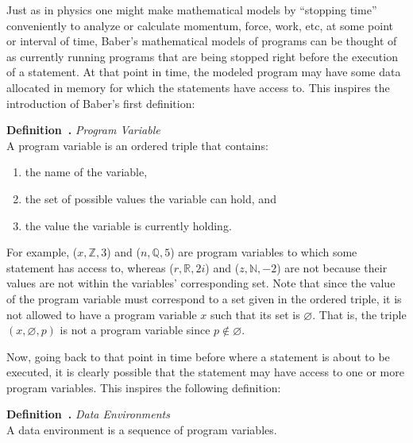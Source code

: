 \documentclass[11pt]{article}
\newcounter{definition}
\newenvironment{definition}[1][]{\stepcounter{definition}\par\medskip\noindent
\textbf{Definition~\thesection.\thedefinition #1} \rmfamily}{}
\newcounter{example}
\begin{document}
Just as in physics one might make mathematical models by ``stopping time'' conveniently to analyze or calculate momentum, force, work, etc, at some point or interval of time, Baber's mathematical models of programs can be thought of as currently running programs that are being stopped right before the execution of a statement. At that point in time, the modeled program may have some data allocated in memory for which the statements have access to. This inspires the introduction of Baber's first definition:

\begin{definition} \emph{Program Variable} \\
A program variable is an ordered triple that contains:
\begin{enumerate}[noitemsep]
\item the name of the variable,
\item the set of possible values the variable can hold, and
\item the value the variable is currently holding.
\end{enumerate}
\end{definition}

For example, ($x,\mathbb{Z},3$) and ($n,\mathbb{Q},5$) are program variables to which some statement has access to, whereas ($r,\mathbb{R},2i$) and ($z,\mathbb{N},-2$) are not because their values are not within the variables' corresponding set. Note that since the value of the program variable must correspond to a set given in the ordered triple, it is not allowed to have a program variable $x$ such that its set is $\varnothing$. That is, the triple $(x,\varnothing,p)$ is not a program variable since $p\notin\varnothing$.

Now, going back to that point in time before where a statement is about to be executed, it is clearly possible that the statement may have access to one or more program variables. This inspires the following definition:

\begin{definition} \emph{Data Environments} \\
A data environment is a sequence of program variables.
\end{definition}
\medskip
\end{document}

